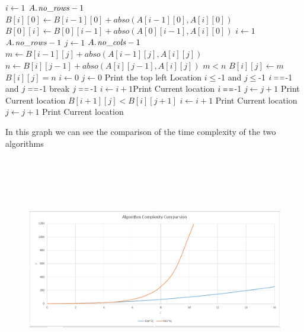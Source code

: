 \documentclass{article}
\begin{document}
\begin{codebox}
\li \For $i\gets 1 $ \To $\attrib{A}{no\_rows}-1$
\li \Do $B[i][0] \gets B[i-1][0]+abso(A[i-1][0],A[i][0])$
\li $B[0][i] \gets B[0][i-1]+abso(A[0][i-1],A[i][0])$ \End
\li \For $i\gets 1 $ \To $\attrib{A}{no\_rows}-1$
\li \Do \For $j\gets 1 $ \To $\attrib{A}{no\_cols}-1$ \Do
\li  $ m \gets B[i-1][j]+abso(A[i-1][j],A[i][j])  $
\li  $ n \gets B[i][j-1]+abso(A[i][j-1],A[i][j])  $
\li \If $m<n$ \Then \li
$B[i][j] \gets m$
\li \Else  \li $B[i][j]=n$ \End \End \End
\li $i \gets 0$
\li $j \gets 0$
\li Print the top left Location
\li
\While $i \le $-1$ $ and $j \le $-1$ $\Do\li
 \If $i \isequal $-1$ $  and  $j \isequal $-1$ $      \Then \li break\End
 \li\If $j \isequal $-1$  $ 
 \Then \li $i \gets i+1$\li Print Current location  
 \li \ElseIf $i \isequal $-1$ $ \Then \li 
 $ j \gets j+1$ \li Print Current location
 \li \ElseIf $ B[i+1][j] <  B[i][j+1] $ \Then \li 
 $ i \gets i+1$ \li Print Current location\li 
 \Else \Then \li $ j \gets j+1$ \li Print Current location
\end{codebox}
\newpage
\par In this graph we can see the comparison of the time complexity of the two algorithms
\begin{figure}[h]
\includegraphics[width=12 cm, height=10cm]{graph}
\end{figure}
\newpage
\end{document}
